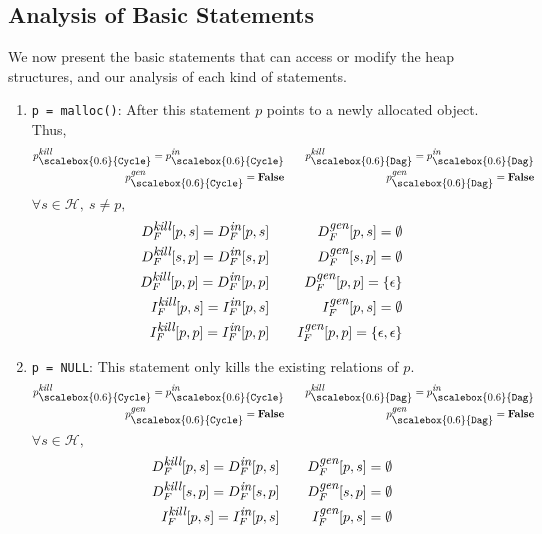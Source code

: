 \documentclass{sig-alternate}
\newcommand{\is}{\itemsep -1mm} %
\newcommand{\p}{\ensuremath{p}}
\newcommand{\s}{\ensuremath{s}}
\newcommand{\heap}{\ensuremath{\mathcal{H}}}
\newcommand{\subC}{\mbox{\scalebox{0.6}{\Cycle}}}
\newcommand{\subD}{\mbox{\scalebox{0.6}{\Dag}}}
\newcommand{\epsilonset}{\ensuremath{\{\epsilon\}}}
\newcommand{\epsilonpairset}{\ensuremath{\{\epsilon,\epsilon\}}}
\newcommand{\din}{\mbox{\footnotesize\em in}}
\newcommand{\dkill}{\mbox{\footnotesize\em kill}}
\newcommand{\dgen}{\mbox{\footnotesize\em gen}}
\newcommand{\GenC}[1]{\ensuremath{{#1}_{\subC}^{\dgen}}}
\newcommand{\GenD}[1]{\ensuremath{{#1}_{\subD}^{\dgen}}}
\newcommand{\KillC}[1]{\ensuremath{{#1}_{\subC}^{\dkill}}}
\newcommand{\KillD}[1]{\ensuremath{{#1}_{\subD}^{\dkill}}}
\newcommand{\InC}[1]{\ensuremath{{#1}_{\subC}^{\din}}}
\newcommand{\InD}[1]{\ensuremath{{#1}_{\subD}^{\din}}}
\newcommand{\Dag}{{\tt Dag}}
\newcommand{\Cycle}{{\tt Cycle}}
\newcommand{\false}{\textbf{False}}
\begin{document}
\subsection{Analysis of Basic Statements} \label{Analysis_of_Basic_Statements} 
We now present the basic statements that can access or modify
the heap structures, and our analysis of each kind of
statements.
\begin{enumerate}\is
\item {{\tt p = malloc()}}:
  After this statement $\p$ points to a newly allocated
  object. Thus,
\begin{eqnarray*}
  \KillC{p}  = \InC{p} &\quad& \KillD{p} = \InD{p} \\
  \GenC{p} = \false 	 &\quad& \GenD{p} = \false 
\end{eqnarray*}
$\forall \s \in \heap,\ \s \not= \p,$
\begin{eqnarray*}
  D_F^{\dkill}[\p,\s]  =  D_F^{\din}[\p,\s] &\quad&
  D_F^{\dgen}[\p,\s]    =  \emptyset \\ 
  D_F^{\dkill}[\s,\p]  =  D_F^{\din}[\s,\p] &\quad&
  D_F^{\dgen}[\s,\p]    =  \emptyset \\
  D_F^{\dkill}[\p,\p]  =  D_F^{\din}[\p,\p] &\quad&
  D_F^{\dgen}[\p,\p]    =  \epsilonset\\
  I_F^{\dkill}[\p,\s]  =  I_F^{\din}[\p,\s] &\quad&
  I_F^{\dgen}[\p,\s]    =  \emptyset \\
  I_F^{\dkill}[\p,\p]  =  I_F^{\din}[\p,\p] &\quad&
  I_F^{\dgen}[\p,\p]    =  \epsilonpairset 
\end{eqnarray*}

\item{\tt p = NULL}:
This statement only kills the existing relations of \p.
\begin{eqnarray*}
  \KillC{p}  = \InC{p} &\quad& \KillD{p} = \InD{p} \\
  \GenC{p} = \false 	 &\quad& \GenD{p} = \false \\
\end{eqnarray*}
$\forall \s \in \heap,$
\begin{eqnarray*}
  D_F^{\dkill}[\p,\s]  =  D_F^{\din}[\p,\s] &\quad&
  D_F^{\dgen}[\p,\s]    =  \emptyset \\ 
  D_F^{\dkill}[\s,\p]  =  D_F^{\din}[\s,\p] &\quad&
  D_F^{\dgen}[\s,\p]    =  \emptyset \\
  I_F^{\dkill}[\p,\s]  =  I_F^{\din}[\p,\s] &\quad&
  I_F^{\dgen}[\p,\s]    =  \emptyset 
\end{eqnarray*}


\end{enumerate}
\end{document}
